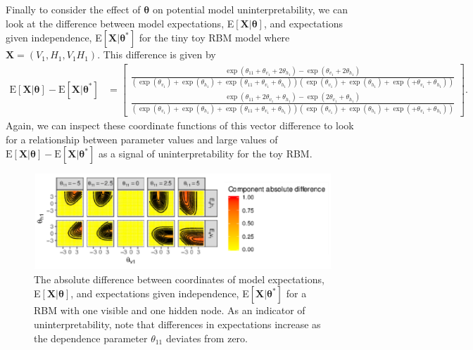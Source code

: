 \documentclass[12pt]{article}
\theoremstyle{definition}
\begin{document}
Finally to consider the effect of \(\boldsymbol \theta\) on potential
model uninterpretability, we can look at the difference between model
expectations, E\(\left[\boldsymbol X | \boldsymbol \theta\right]\), and
expectations given independence,
E\(\left[\boldsymbol X | \boldsymbol \theta^*\right ]\) for the tiny toy
RBM model where \(\boldsymbol X = (V_1, H_1, V_1 H_1)\). This difference
is given by
\begin{align*}
\text{E}\left[\boldsymbol X | \boldsymbol \theta\right] -   \text{E}\left[\boldsymbol X | \boldsymbol \theta^* \right] 
&= \left[
\begin{matrix}
\frac{\exp\left(\theta_{11} + \theta_{v_1} + 2\theta_{h_1}\right) - \exp\left( \theta_{v_1} + 2\theta_{h_1}\right) }{\left(\exp\left(\theta_{v_1}\right) + \exp\left(\theta_{h_1}\right) + \exp\left(\theta_{11} + \theta_{v_1} + \theta_{h_1}\right)\right)\left(\exp\left(\theta_{v_1}\right) + \exp\left(\theta_{h_1}\right) + \exp\left(+ \theta_{v_1} + \theta_{h_1}\right)\right)} \\
\frac{\exp\left(\theta_{11} + 2\theta_{v_1} + \theta_{h_1}\right) - \exp\left( 2\theta_{v_1} + \theta_{h_1}\right)  }{\left(\exp\left(\theta_{v_1}\right) + \exp\left(\theta_{h_1}\right) + \exp\left(\theta_{11} + \theta_{v_1} + \theta_{h_1}\right)\right)\left(\exp\left(\theta_{v_1}\right) + \exp\left(\theta_{h_1}\right) + \exp\left(+ \theta_{v_1} + \theta_{h_1}\right)\right)}
\end{matrix}\right].
\end{align*}
Again, we can inspect these coordinate functions of this vector
difference to look for a relationship between parameter values and large
values of
\(\text{E}[\boldsymbol X|\boldsymbol \theta] - \text{E}[\boldsymbol X| \boldsymbol \theta^*]\)
as a signal of uninterpretability for the toy RBM. \par
\begin{figure}

{\centering \includegraphics{paper_files/figure-latex/uninterp-1} 

}

\caption{The absolute difference between coordinates of model expectations, E$\left[\boldsymbol X | \boldsymbol \theta\right]$, and expectations given independence, E$\left[\boldsymbol X | \boldsymbol \theta^* \right ]$ for a RBM with one visible and one hidden node. As an indicator of uninterpretability, note that differences in expectations increase as the dependence parameter $\theta_{11}$ deviates from zero.}\label{fig:uninterp}
\end{figure}
\end{document}
